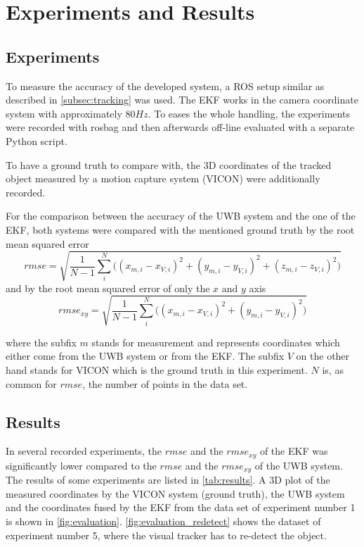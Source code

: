 

\chapter{Experiments and Results}

\section{Experiments}
To measure the accuracy of the developed system, a \ac{ROS} setup similar as described in \autoref{subsec:tracking} was used. The \acf{EKF} works in the camera coordinate system with approximately $80\mathit{Hz}$. To eases the whole handling, the experiments were recorded with rosbag and then afterwards off-line evaluated with a separate Python script.

To have a ground truth to compare with, the 3D coordinates of the tracked object measured by a motion capture system (VICON) were additionally recorded.

For the comparison between the accuracy of the \ac{UWB} system and the one of the \ac{EKF}, both systems were compared with the mentioned ground truth by the root mean squared error $$\textit{rmse} = \sqrt{\frac{1}{N - 1} \sum_i^N \big( (x_{m,i} - x_{V,i})^2 + (y_{m,i} - y_{V,i})^2 + (z_{m,i} - z_{V,i})^2\big)}$$
and by the root mean squared error of only the $x$ and $y$ axis
$$\textit{rmse}_{xy} = \sqrt{\frac{1}{N - 1} \sum_i^N \big( (x_{m,i} - x_{V,i})^2 + (y_{m,i} - y_{V,i})^2\big)}$$

where the subfix $m$ stands for measurement and represents coordinates which either come from the \ac{UWB} system or from the \ac{EKF}. The subfix $V$ on the other hand stands for VICON which is the ground truth in this experiment. $N$ is, as common for $\textit{rmse}$, the number of points in the data set.

\section{Results}
In several recorded experiments, the $\textit{rmse}$ and the $\textit{rmse}_{xy}$ of the \ac{EKF} was significantly lower compared to the $\textit{rmse}$ and the $\textit{rmse}_{xy}$ of the \ac{UWB} system. The results of some experiments are listed in \autoref{tab:results}. A 3D plot of the measured coordinates by the VICON system (ground truth), the \ac{UWB} system and the coordinates fused by the \ac{EKF} from the data set of experiment number 1 is shown in \autoref{fig:evaluation}. \autoref{fig:evaluation_redetect} shows the dataset of experiment number 5, where the visual tracker has to re-detect the object.

